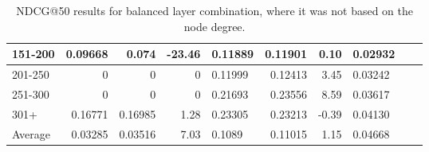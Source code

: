 \begin{table*}[h!]
\begin{tabular}{|l|r|r|r||l|r|r||l|l|l|}
        151-200 & 0.09668                                 & 0.074                          & -23.46                           & 0.11889 & 0.11901                  & 0.10                       & 0.02932 &                        &                        \\ \hline
        201-250 & 0                                       & 0                              & 0                                & 0.11999 & 0.12413                  & 3.45                       & 0.03242 &                        &                        \\ \hline
        251-300 & 0                                       & 0                              & 0                                & 0.21693 & 0.23556                  & 8.59                       & 0.03617 &                        &                        \\ \hline
        301+    & 0.16771                                 & 0.16985                        & 1.28                             & 0.23305 & 0.23213                  & -0.39                      & 0.04130 &                        &                        \\ \hline
        Average & 0.03285                                 & 0.03516                        & 7.03                             & 0.1089  & 0.11015                  & 1.15                       & 0.04668 &                        &                        \\ \hline
    \end{tabular}
    \caption{NDCG@50 results for balanced layer combination, where it was not based on the node degree.}
    \label{tab:balanced-layer-combination-ndcg}
\end{table*}

